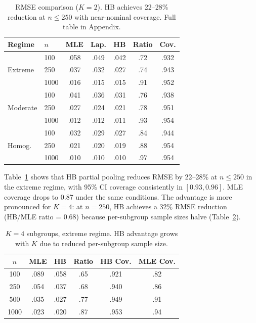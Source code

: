 \documentclass[11pt,a4paper]{article}
\begin{document}
\begin{table}[t]
\centering
\small
\setlength{\tabcolsep}{3.5pt}
\begin{tabular}{llccccc}
\toprule
Regime & $n$ & MLE & Lap. & HB & Ratio & Cov. \\
\midrule
\multirow{3}{*}{Extreme}
 & 100 & .058 & .049 & .042 & .72 & .932 \\
 & 250 & .037 & .032 & .027 & .74 & .943 \\
 & 1000 & .016 & .015 & .015 & .91 & .952 \\
\midrule
\multirow{3}{*}{Moderate}
 & 100 & .041 & .036 & .031 & .76 & .938 \\
 & 250 & .027 & .024 & .021 & .78 & .951 \\
 & 1000 & .012 & .012 & .011 & .93 & .954 \\
\midrule
\multirow{3}{*}{Homog.}
 & 100 & .032 & .029 & .027 & .84 & .944 \\
 & 250 & .021 & .020 & .019 & .88 & .954 \\
 & 1000 & .010 & .010 & .010 & .97 & .954 \\
\bottomrule
\end{tabular}
\caption{RMSE comparison ($K=2$). HB achieves 22--28\% reduction at $n \leq 250$ with near-nominal coverage. Full table in Appendix.}
\label{tab:hb_k2}
\end{table}

Table~\ref{tab:hb_k2} shows that HB partial pooling reduces RMSE by 22--28\% at $n \leq 250$ in the extreme regime, with 95\% CI coverage consistently in $[0.93, 0.96]$. MLE coverage drops to 0.87 under the same conditions. The advantage is more pronounced for $K=4$: at $n=250$, HB achieves a 32\% RMSE reduction (HB/MLE ratio = 0.68) because per-subgroup sample sizes halve (Table~\ref{tab:hb_k4}).

\begin{table}[t]
\centering
\small
\begin{tabular}{cccccc}
\toprule
$n$ & MLE & HB & Ratio & HB Cov. & MLE Cov. \\
\midrule
100 & .089 & .058 & .65 & .921 & .82 \\
250 & .054 & .037 & .68 & .940 & .86 \\
500 & .035 & .027 & .77 & .949 & .91 \\
1000 & .023 & .020 & .87 & .953 & .94 \\
\bottomrule
\end{tabular}
\caption{$K=4$ subgroups, extreme regime. HB advantage grows with $K$ due to reduced per-subgroup sample size.}
\label{tab:hb_k4}
\end{table}
\end{document}
